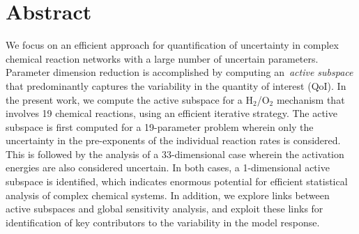 \section*{Abstract}
We focus on an efficient approach for quantification of uncertainty in complex chemical
reaction networks with a large number of uncertain parameters.  Parameter
dimension reduction is accomplished by computing an~\emph{active subspace} that
predominantly captures the variability in the quantity of interest (QoI).  In
the present work, we compute the active subspace for a H$_2$/O$_2$ mechanism 
that involves 19 chemical reactions, using an efficient iterative strategy.  The
active subspace is first computed for a 19-parameter problem wherein only the
uncertainty in the pre-exponents of the individual reaction rates is
considered. This is followed by the analysis of a 33-dimensional case wherein
the activation energies are also considered uncertain.  In both cases, a
1-dimensional active subspace is identified, which indicates enormous
potential for efficient statistical analysis of complex chemical systems. In
addition, we explore links between active subspaces and global sensitivity
analysis, and exploit these links for identification of key
contributors to the variability in the model response.
